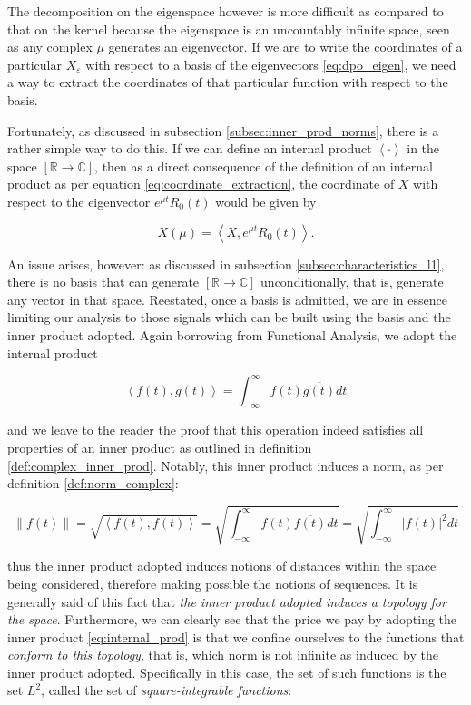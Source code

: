 	The decomposition on the eigenspace however is more difficult as compared to that on the kernel because the eigenspace is an uncountably infinite space, seen as any complex $\mu$ generates an eigenvector. If we are to write the coordinates of a particular $X_\varepsilon$ with respect to a basis of the eigenvectors \eqref{eq:dpo_eigen}, we need a way to extract the coordinates of that particular function with respect to the basis.

	Fortunately, as discussed in subsection \ref{subsec:inner_prod_norms}, there is a rather simple way to do this. If we can define an internal product $\left<\cdot\right>$ in the space $\left[\mathbb{R}\to\mathbb{C}\right]$, then as a direct consequence of the definition of an internal product as per equation \eqref{eq:coordinate_extraction}, the coordinate of $X$ with respect to the eigenvector $e^{\mu t}R_0(t)$ would be given by

\begin{equation} X\left(\mu\right) = \left<X, e^{\mu t} R_0(t)\right> .\end{equation}

	An issue arises, however: as discussed in subsection \ref{subsec:characteristics_l1}, there is no basis that can generate $\left[\mathbb{R}\to\mathbb{C}\right]$ unconditionally, that is, generate any vector in that space. Reestated, once a basis is admitted, we are in essence limiting our analysis to those signals which can be built using the basis and the inner product adopted. Again borrowing from Functional Analysis, we adopt the internal product

\begin{equation} \left< f(t),g(t)\right> = \int_{-\infty}^{\infty} f(t)\overline{g(t)} dt \label{eq:internal_prod} \end{equation}

	\noindent and we leave to the reader the proof that this operation indeed satisfies all properties of an inner product as outlined in definition \ref{def:complex_inner_prod}. Notably, this inner product induces a norm, as per definition \ref{def:norm_complex}:

\begin{equation} \left\lVert f(t)\right\rVert = \sqrt{\left< f(t),f(t)\right>} = \sqrt{\int_{-\infty}^{\infty} f(t)\overline{f(t)} dt} = \sqrt{\int_{-\infty}^{\infty} \left\lvert f(t)\right\rvert^2 dt}\end{equation}

	\noindent thus the inner product adopted induces notions of distances within the space being considered, therefore making possible the notions of sequences. It is generally said of this fact that \textit{the inner product adopted induces a topology for the space}. Furthermore, we can clearly see that the price we pay by adopting the inner product \eqref{eq:internal_prod} is that we confine ourselves to the functions that \textit{conform to this topology}, that is,  which norm is not infinite as induced by the inner product adopted. Specifically in this case, the set of such functions is the set $L^2$, called the set of \textit{square-integrable functions}:

